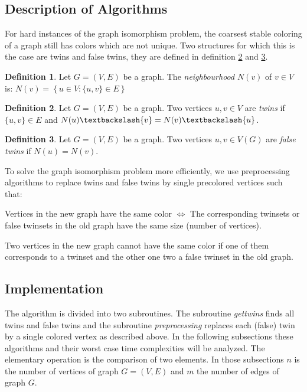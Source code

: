 \documentclass[twoside]{article}
\theoremstyle{definition}
\newtheorem{definition}{Definition}
\theoremstyle{plain}
\begin{document}
\begin{multicols}{2}
\section{Description of Algorithms}
For hard instances of the graph isomorphism problem, the coarsest stable coloring of a graph still has colors which are not unique. Two structures for which this is the case are twins and false twins, they are defined in definition \ref{deftwins} and \ref{deffalsetwins}.
\begin{definition}
Let $G = (V,E)$ be a graph. The \emph{neighbourhood} $N(v)$ of $v \in V$ is:
$N(v) = \left\{{u \in V : \{u,v\} \in E}\right\}$
\end{definition}
\begin{definition}\label{deftwins}
Let $G = (V,E)$ be a graph.
Two vertices $u, v \in V$ are \emph{twins} if $\{u,v\} \in E$ and $N(u)\textbackslash \{v\} = N(v)\textbackslash \{u\}$.
\end{definition}
\begin{definition}\label{deffalsetwins}
Let $G = (V,E)$ be a graph.
Two vertices $u, v \in V(G)$ are \emph{false twins} if $N(u) = N(v).$
\end{definition}

To solve the graph isomorphism problem more efficiently, we use preprocessing algorithms to replace twins and false twins by single precolored vertices such that:
\begin{compactenum}
\item Vertices in the new graph have the same color $\iff$ The corresponding twinsets or false twinsets in the old graph have the same size (number of vertices).
\item Two vertices in the new graph cannot have the same color if one of them corresponds to a twinset and the other one two a false twinset in the old graph.
\end{compactenum}

\subsection{Implementation}
The algorithm is divided into two subroutines. The subroutine \emph{gettwins} finds all twins and false twins and the subroutine \emph{preprocessing} replaces each (false) twin by a single colored vertex as described above. In the following subsections these algorithms and their worst case time complexities will be analyzed. The elementary operation is the comparison of two elements. In those subsections $n$ is the number of vertices of graph $G = (V,E)$ and $m$  the number of edges of graph $G$.


\end{multicols}
\end{document}

